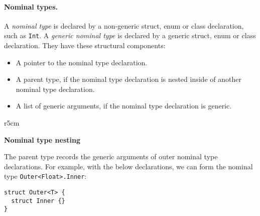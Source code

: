 \documentclass[../generics]{subfiles}
\begin{document}
\paragraph{Nominal types.}
A \emph{nominal type} is declared by a non-generic struct, enum or class declaration, such as \texttt{Int}. A \emph{generic nominal type} is declared by a generic struct, enum or class declaration. They have these structural components:
\begin{itemize}
\item A pointer to the nominal type declaration.
\item A parent type, if the nominal type declaration is nested inside of another nominal type declaration.
\item A list of generic arguments, if the nominal type declaration is generic.
\end{itemize}

\begin{wrapfigure}[9]{r}{5cm}
\begin{center}\textbf{Nominal type nesting}\end{center}
\end{wrapfigure}

The parent type records the generic arguments of outer nominal type declarations. For example, with the below declarations, we can form the nominal type \texttt{Outer<Float>.Inner}:

\medskip

\noindent
\begin{minipage}{24em}
\begin{Verbatim}
struct Outer<T> {
  struct Inner {}
}
\end{Verbatim}
\end{minipage}
\end{document}
